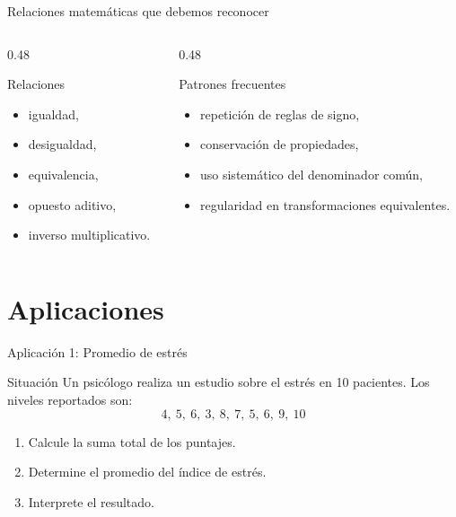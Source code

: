 \documentclass[handout,aspectratio=169,10pt]{beamer}
\begin{document}
	\begin{frame}{Relaciones matemáticas que debemos reconocer}
		\begin{columns}[T]
			\begin{column}{0.48\textwidth}
				\begin{exampleblock}{Relaciones}
					\begin{itemize}[<+->]
						\item igualdad,
						\item desigualdad,
						\item equivalencia,
						\item opuesto aditivo,
						\item inverso multiplicativo.
					\end{itemize}
				\end{exampleblock}
			\end{column}
			
			\begin{column}{0.48\textwidth}
				\begin{block}{Patrones frecuentes}
					\begin{itemize}[<+->]
						\item repetición de reglas de signo,
						\item conservación de propiedades,
						\item uso sistemático del denominador común,
						\item regularidad en transformaciones equivalentes.
					\end{itemize}
				\end{block}
			\end{column}
		\end{columns}
	\end{frame}
	
	\section{Aplicaciones}
	
	\begin{frame}{Aplicación 1: Promedio de estrés}
		\begin{block}{Situación}
			Un psicólogo realiza un estudio sobre el estrés en 10 pacientes. Los niveles reportados son:
			\[
			4,\ 5,\ 6,\ 3,\ 8,\ 7,\ 5,\ 6,\ 9,\ 10
			\]
		\end{block}
		
		\begin{enumerate}[<+->]
			\item Calcule la suma total de los puntajes.
			\item Determine el promedio del índice de estrés.
			\item Interprete el resultado.
		\end{enumerate}
	\end{frame}
	
\end{document}
